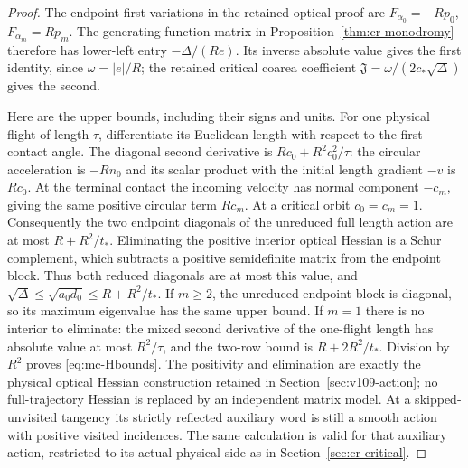 \begin{proof}
The endpoint first variations in the retained optical proof are
$F_{\alpha_0}=-Rp_0$, $F_{\alpha_m}=Rp_m$. The generating-function
matrix in Proposition~\ref{thm:cr-monodromy} therefore has lower-left
entry $-\Delta/(Re)$. Its inverse absolute value gives the first
identity, since $\omega=|e|/R$; the retained critical coarea coefficient
$\mathfrak J=\omega/(2c_*\sqrt\Delta)$ gives the second.

Here are the upper bounds, including their signs and units. For one
physical flight of length $\tau$, differentiate its Euclidean length
with respect to the first contact angle. The diagonal second derivative
is $R c_0+R^2c_0^2/\tau$: the circular acceleration is $-Rn_0$
and its scalar product with the initial length gradient $-v$ is
$Rc_0$. At the terminal contact the incoming velocity has normal
component $-c_m$, giving the same positive circular term $Rc_m$.
At a critical orbit $c_0=c_m=1$. Consequently the two endpoint
diagonals of the unreduced full length action are at most
$R+R^2/t_*$. Eliminating the positive interior optical Hessian is a
Schur complement, which subtracts a positive semidefinite matrix from
the endpoint block. Thus both reduced diagonals are at most this value,
and $\sqrt\Delta\le\sqrt{a_0d_0}\le R+R^2/t_*$.
If $m\ge2$, the unreduced endpoint block is diagonal, so its maximum
eigenvalue has the same upper bound. If $m=1$ there is no interior to
eliminate: the mixed second derivative of the one-flight length has
absolute value at most $R^2/\tau$, and the two-row bound is
$R+2R^2/t_*$. Division by $R^2$ proves \eqref{eq:mc-Hbounds}.
The positivity and elimination are exactly the physical optical
Hessian construction retained in Section~\ref{sec:v109-action};
no full-trajectory Hessian is replaced by an independent matrix model.
At a skipped-unvisited tangency its strictly reflected auxiliary word
is still a smooth action with positive visited incidences. The same
calculation is valid for that auxiliary action, restricted to its
actual physical side as in Section~\ref{sec:cr-critical}.
\end{proof}

